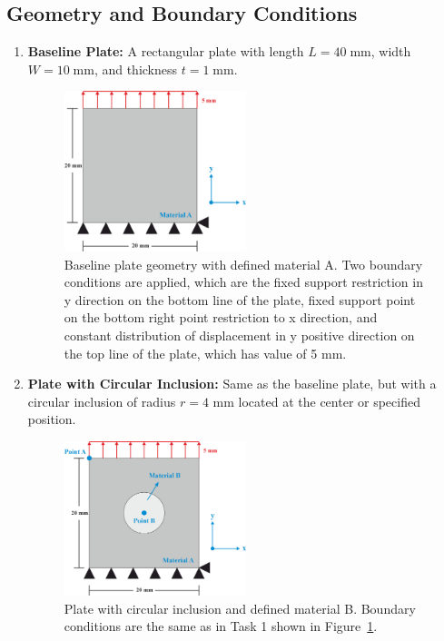\documentclass[12pt]{article}
\begin{document}
\subsection{Geometry and Boundary Conditions}
\begin{enumerate}
     \item \textbf{Baseline Plate:} A rectangular plate with length $L = 40 \;\text{mm}$, width $W = 10 \;\text{mm}$, and thickness $t = 1 \;\text{mm}$.
        \begin{figure}[H]
        \centering
            \includegraphics[width=0.5\textwidth]{images/TaskQ1.png}
        \caption{Baseline plate geometry with defined material A. Two boundary conditions are applied, which are the 
        fixed support restriction in y direction on the bottom line of the plate, fixed support point on the bottom right point restriction to 
        x direction, and constant distribution of displacement in y positive direction on the top line of the plate, which has value of 5 mm.}
        \label{fig:geometryQ1}
\end{figure}

    \item \textbf{Plate with Circular Inclusion:} Same as the baseline plate, but with a circular inclusion of radius $r=4$ mm located at the center or specified position.
\begin{figure}[H]
        \centering
            \includegraphics[width=0.5\textwidth]{images/TaskQ2.png}
        \caption{Plate with circular inclusion and defined material B. Boundary conditions are the same as in Task 1 shown in Figure~\ref{fig:geometryQ1}.}
        \label{fig:geometryQ2}
\end{figure}
\end{enumerate}
\end{document}
